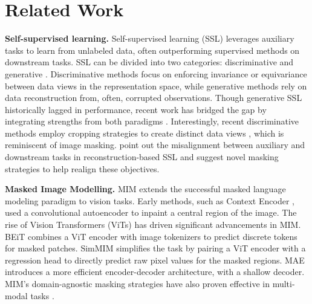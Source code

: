 \section{Related Work}
\textbf{Self-supervised learning.} 
Self-supervised learning (SSL) leverages auxiliary tasks to learn from unlabeled data, often outperforming supervised methods on downstream tasks. SSL can be divided into two categories: discriminative and generative \citep{liu2021self}. Discriminative methods \citep{chen2020simple,caron_emerging_2021} focus on enforcing invariance or equivariance between data views in the representation space, while generative methods \citep{he_masked_2021,bizeul2024probabilistic} rely on data reconstruction from, often, corrupted observations. Though generative SSL historically lagged in performance, recent work has bridged the gap by integrating strengths from both paradigms \citep{assran_masked_2022,dong2023peco,oquab2023dinov2,chen2024context,lehner_contrastive_2023}. Interestingly, recent discriminative methods employ cropping strategies to create distinct data views \citep{oquab2023dinov2,assran_self-supervised_2023}, which is reminiscent of image masking. \citet{balestriero_learning_2024} point out the misalignment between auxiliary and downstream tasks in reconstruction-based SSL and suggest novel masking strategies to help realign these objectives.

\textbf{Masked Image Modelling.}  MIM extends the successful masked language modeling paradigm to vision tasks. Early methods, such as Context Encoder \citep{pathak2016context}, used a convolutional autoencoder to inpaint a central region of the image. The rise of Vision Transformers (ViTs) \citep{dosovitskiy_image_2021} has driven significant advancements in MIM. BEiT \citep{zhou2021ibot,bao_beit_2022} combines a ViT encoder with image tokenizers \citep{ramesh2021zero} to predict discrete tokens for masked patches. SimMIM \citep{xie2022simmim} simplifies the task by pairing a ViT encoder with a regression head to directly predict raw pixel values for the masked regions. MAE \citep{he_masked_2021} introduces a more efficient encoder-decoder architecture, with a shallow decoder. MIM’s domain-agnostic masking strategies have also proven effective in multi-modal tasks \citep{baevski_data2vec_2022,bachmann2022multimae}.

